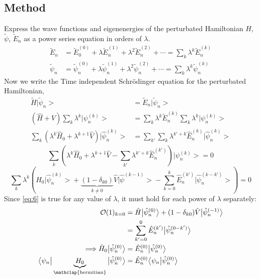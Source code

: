 \documentclass[12pt]{article}
\begin{document}
\subsection{Method}
Express the wave functions and eigenenergies of the perturbated Hamiltonian $H$, $\tilde{\psi}$, $\tilde{E}_n$ 
as a power series equation in orders of $\lambda$.
\begin{align*}
	\tilde{E}_n & = \tilde{E}^{(0)}_0 + \lambda \tilde{E}^{(1)}_n + \lambda^2 \tilde{E}^{(2)}_n
	+ \cdots = \sum_{k} \lambda^{k} \tilde{E}^{(k)}_n\\
	\tilde{\psi}_n & = \tilde{\psi}^{(0)}_n + \lambda \tilde{\psi}^{(1)}_n + \lambda^2 \tilde{\psi}^{(2)}_n 
	+ \cdots = \sum_{k} \lambda^k \tilde{\psi}^{(k)}_n
\end{align*}
Now we write the Time independent Schr\"odinger equation for the perturbated Hamiltonian,
\begin{align}
  \tilde{H} \big|\tilde{\psi}_n \big > & = \tilde{E}_n \big|\tilde{\psi}_n \big >\\
	(\hat{H} + \hat{V}) \sum_{k} \lambda^k \big| \psi^{(k)}_n \big > & = \sum_{k} \lambda^k \tilde{E}^{(k)}_n \sum_{k}
	\lambda^k \big|\psi^{(k)}_n \big>\\
	\sum_{k}(\lambda^k \hat{H}_0 + \lambda^{k+1} \hat{V}) \big|\hat{\psi}^{(k)}_n \big > & = \sum_{k'} \sum_{k}
	\lambda^{k'+k} \hat{E}^{(k)}_n \big| \hat{\psi}^{(k)}_n \big >
\end{align}
\begin{equation}
	\sum_{k} \left(\lambda^k \hat{H}_0 + \lambda^{k+1} \hat{V} - \sum_{k'} \lambda^{k'+ k}  
	\hat{E}^{(k')}_n \right ) \big|\psi^{(k)}_n \big > = 0 
\end{equation}
\begin{equation}
  \label{eq:6}
	\sum_{k} \lambda^{k} \left(\hat{H}_0 \big| \hat{\psi}^{(k)}_n \big > + \underbrace{(1 - \delta_
	{k0})}_{k\neq 0} \hat{V} \big| \hat{\psi}^{(k-1)} \big > - \sum_{k=0}^{k} \hat{E}^{(k')}_n 
	\big | \hat{\psi}^{(k-k')}_n \big > \right ) = 0
\end{equation}
Since \ref{eq:6} is true for any value of $\lambda$, it must hold for each power of $\lambda$ separately:
\begin{align*}
	\mathcal{O}(1)_{k=0} & = \hat{H} \big | \hat{\psi}^{(0)}_n \big > + (1 - \delta_{k0}) \hat{V}
	\big | \hat{\psi}^{(-1)}_n \big >\\
	& = \sum_{k' = 0}^{0} \hat{E}^{(k')}_n \big| \hat{\psi}^{(0-k')}_n \big>\\
	\Longrightarrow \hat{H}_0 \big| \hat{\psi}^{(0)}_n \big > & = \hat{E}^{(0)}_n \big| \hat{\psi}^{(0)}_n \big>\\
  \big < \psi_n \big | \underbrace{H_0}_{\mathclap{\text{hermitian}}} \big| \hat{\psi}^{(0)}_n \big > & = \hat{E}^{(0)}_n \big < \psi_n   \big |
	\hat{\psi}^{(0)}_n\big>
\end{align*}
\end{document}
